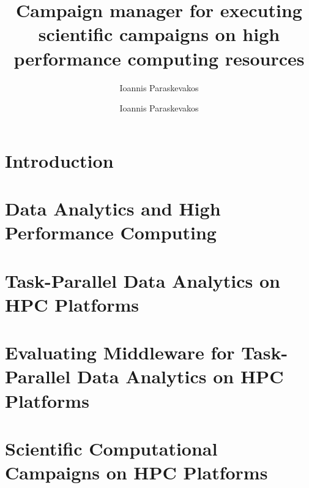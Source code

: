 \documentclass[final]{ruthesis}
\begin{document}
\author{Ioannis Paraskevakos}
\copyrightp
\title{Campaign manager for executing scientific campaigns on high performance computing resources}
\author{Ioannis Paraskevakos}
\figurespage
\tablespage

\abstract{}
\acknowledgements{}

\beforepreface
\afterpreface

\chapter{Introduction}

\label{ch:intro}

\chapter{Data Analytics and High Performance Computing}

\label{ch:pilot-data-hadoop}

\chapter{Task-Parallel Data Analytics on HPC Platforms}

\label{ch:task-par}

\chapter{Evaluating Middleware for Task-Parallel Data Analytics on HPC Platforms}

\label{ch:designs}

\chapter{Scientific Computational Campaigns on HPC Platforms}

\label{ch:cmanager}
\end{document}
